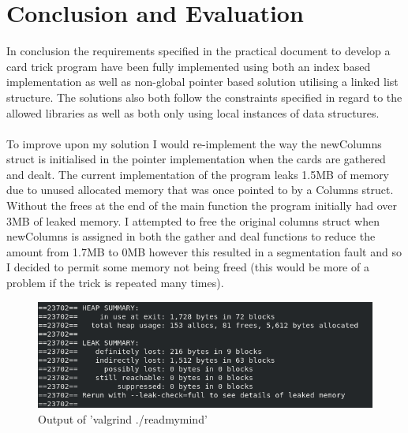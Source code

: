\documentclass[11]{article}
\begin{document}
	\section{Conclusion and Evaluation}
	In conclusion the requirements specified in the practical document to develop a card trick program have been fully implemented using both an index based implementation as well as non-global pointer based solution utilising a linked list structure. The solutions also both follow the constraints specified in regard to the allowed libraries as well as both only using local instances of data structures. \\\\ To improve upon my solution I would re-implement the way the newColumns struct is initialised in the pointer implementation when the cards are gathered and dealt. The current implementation of the program leaks 1.5MB of memory due to unused allocated memory that was once pointed to by a Columns struct. Without the frees at the end of the main function the program initially had over 3MB of leaked memory. I attempted to free the original columns struct when newColumns is assigned in both the gather and deal functions to reduce the amount from 1.7MB to 0MB however this resulted in a segmentation fault and so I decided to permit some memory not being freed (this would be more of a problem if the trick is repeated many times).
	
				\begin{figure}[h!]
					\caption{Output of 'valgrind ./readmymind'}				\centering
					\includegraphics[scale=0.5]{ValGrind.png}
				\end{figure}
	
	
\end{document}
